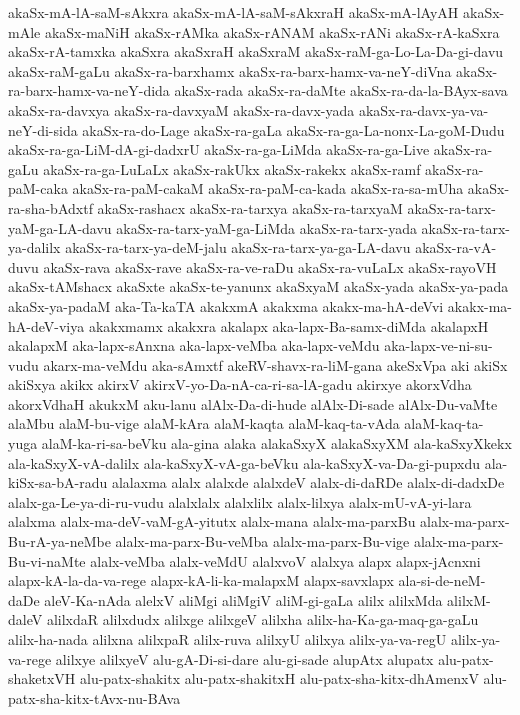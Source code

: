 {akaSx-mA-lA-saM-sAkxra
akaSx-mA-lA-saM-sAkxraH
akaSx-mA-lAyAH
akaSx-mAle
akaSx-maNiH
akaSx-rAMka
akaSx-rANAM
akaSx-rANi
akaSx-rA-kaSxra
akaSx-rA-tamxka
akaSxra
akaSxraH
akaSxraM
akaSx-raM-ga-Lo-La-Da-gi-davu
akaSx-raM-gaLu
akaSx-ra-barxhamx
akaSx-ra-barx-hamx-va-neY-diVna
akaSx-ra-barx-hamx-va-neY-dida
akaSx-rada
akaSx-ra-daMte
akaSx-ra-da-la-BAyx-sava
akaSx-ra-davxya
akaSx-ra-davxyaM
akaSx-ra-davx-yada
akaSx-ra-davx-ya-va-neY-di-sida
akaSx-ra-do-Lage
akaSx-ra-gaLa
akaSx-ra-ga-La-nonx-La-goM-Dudu
akaSx-ra-ga-LiM-dA-gi-dadxrU
akaSx-ra-ga-LiMda
akaSx-ra-ga-Live
akaSx-ra-gaLu
akaSx-ra-ga-LuLaLx
akaSx-rakUkx
akaSx-rakekx
akaSx-ramf
akaSx-ra-paM-caka
akaSx-ra-paM-cakaM
akaSx-ra-paM-ca-kada
akaSx-ra-sa-mUha
akaSx-ra-sha-bAdxtf
akaSx-rashacx
akaSx-ra-tarxya
akaSx-ra-tarxyaM
akaSx-ra-tarx-yaM-ga-LA-davu
akaSx-ra-tarx-yaM-ga-LiMda
akaSx-ra-tarx-yada
akaSx-ra-tarx-ya-dalilx
akaSx-ra-tarx-ya-deM-jalu
akaSx-ra-tarx-ya-ga-LA-davu
akaSx-ra-vA-duvu
akaSx-rava
akaSx-rave
akaSx-ra-ve-raDu
akaSx-ra-vuLaLx
akaSx-rayoVH
akaSx-tAMshacx
akaSxte
akaSx-te-yanunx
akaSxyaM
akaSx-yada
akaSx-ya-pada
akaSx-ya-padaM
aka-Ta-kaTA
akakxmA
akakxma
akakx-ma-hA-deVvi
akakx-ma-hA-deV-viya
akakxmamx
akakxra
akalapx
aka-lapx-Ba-samx-diMda
akalapxH
akalapxM
aka-lapx-sAnxna
aka-lapx-veMba
aka-lapx-veMdu
aka-lapx-ve-ni-su-vudu
akarx-ma-veMdu
aka-sAmxtf
akeRV-shavx-ra-liM-gana
akeSxVpa
aki
akiSx
akiSxya
akikx
akirxV
akirxV-yo-Da-nA-ca-ri-sa-lA-gadu
akirxye
akorxVdha
akorxVdhaH
akukxM
aku-lanu
alAlx-Da-di-hude
alAlx-Di-sade
alAlx-Du-vaMte
alaMbu
alaM-bu-vige
alaM-kAra
alaM-kaqta
alaM-kaq-ta-vAda
alaM-kaq-ta-yuga
alaM-ka-ri-sa-beVku
ala-gina
alaka
alakaSxyX
alakaSxyXM
ala-kaSxyXkekx
ala-kaSxyX-vA-dalilx
ala-kaSxyX-vA-ga-beVku
ala-kaSxyX-va-Da-gi-pupxdu
ala-kiSx-sa-bA-radu
alalaxma
alalx
alalxde
alalxdeV
alalx-di-daRDe
alalx-di-dadxDe
alalx-ga-Le-ya-di-ru-vudu
alalxlalx
alalxlilx
alalx-lilxya
alalx-mU-vA-yi-lara
alalxma
alalx-ma-deV-vaM-gA-yitutx
alalx-mana
alalx-ma-parxBu
alalx-ma-parx-Bu-rA-ya-neMbe
alalx-ma-parx-Bu-veMba
alalx-ma-parx-Bu-vige
alalx-ma-parx-Bu-vi-naMte
alalx-veMba
alalx-veMdU
alalxvoV
alalxya
alapx
alapx-jAcnxni
alapx-kA-la-da-va-rege
alapx-kA-li-ka-malapxM
alapx-savxlapx
ala-si-de-neM-daDe
aleV-Ka-nAda
alelxV
aliMgi
aliMgiV
aliM-gi-gaLa
alilx
alilxMda
alilxM-daleV
alilxdaR
alilxdudx
alilxge
alilxgeV
alilxha
alilx-ha-Ka-ga-maq-ga-gaLu
alilx-ha-nada
alilxna
alilxpaR
alilx-ruva
alilxyU
alilxya
alilx-ya-va-regU
alilx-ya-va-rege
alilxye
alilxyeV
alu-gA-Di-si-dare
alu-gi-sade
alupAtx
alupatx
alu-patx-shaketxVH
alu-patx-shakitx
alu-patx-shakitxH
alu-patx-sha-kitx-dhAmenxV
alu-patx-sha-kitx-tAvx-nu-BAva
}
